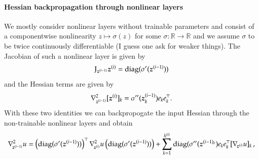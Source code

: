 \paragraph{Hessian backpropagation through nonlinear layers}
We mostly consider nonlinear layers without trainable parameters and consist of a componentwise nonlinearity $z\mapsto \sigma(z)$ for some $\sigma\colon\mathbb R\to\mathbb R$ and we assume $\sigma$ to be twice continuously differentiable (I guess one ask for weaker things).
The Jacobian of such a nonlinear layer is given by
\begin{equation}
  \mathrm{J}_{{\boldsymbol{z}}^{(i-1)}}{\boldsymbol{z}}^{(i)} = \operatorname{diag}(\sigma'({\boldsymbol{z}}^{(i-1)}))
\end{equation}
and the %
Hessian terms are given by
\begin{equation}
  \nabla^2_{{\boldsymbol{z}}^{(i-1)}}[{\boldsymbol{z}}^{(i)}]_k = \sigma''({\boldsymbol{z}}^{(i-1)}_k) e_k  e_k^\top.
\end{equation}
With these two identities we can backpropogate the input Hessian through the non-trainable nonlinear layers and obtain
\begin{equation}
  \nabla_{\!{{\boldsymbol{z}}^{(i-1)}}}^{2}u
  =
  \left( \operatorname{diag}(\sigma'({\boldsymbol{z}}^{(i-1)})) \right)^{\top}
  \nabla_{\!{{\boldsymbol{z}}^{(i)}}}^{2}u
  \left( \operatorname{diag}(\sigma'({\boldsymbol{z}}^{(i-1)})) \right)
  +
  \sum_{k=1}^{h^{(i)}}
  \operatorname{diag}(\sigma''({\boldsymbol{z}}^{(i-1)_k})
  e_k e_k^\top
  [\nabla_{\!{{\boldsymbol{z}}^{(i)}}} u]_k\,,
\end{equation}

